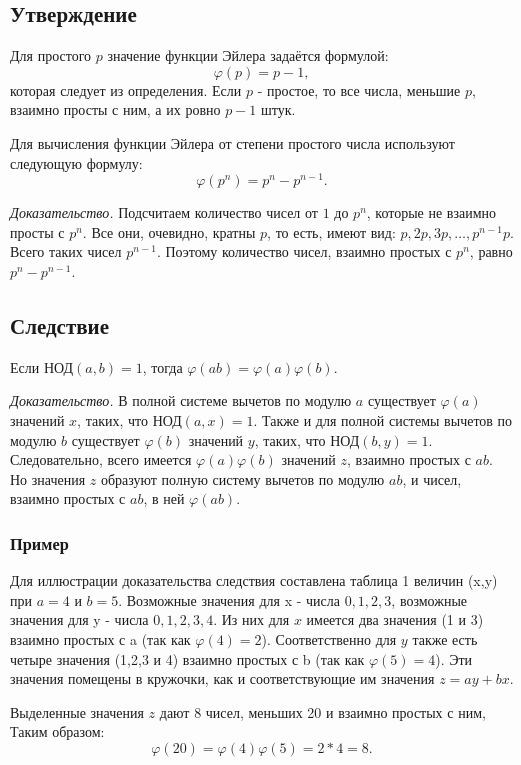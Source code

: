 \documentclass[12pt]{article}
\begin{document}
    \subsection{Утверждение} Для простого $p$ значение функции Эйлера задаётся формулой: \[\varphi(p)=p-1,\] которая следует из определения. Если $p$ - простое, то все числа, меньшие $p$, взаимно просты с ним, а их ровно $p-1$ штук.
    \par Для вычисления функции Эйлера от степени простого числа используют следующую формулу: \[\varphi(p^{n})=p^{n}-p^{n-1}.\]
    \par \textit{Доказательство.} Подсчитаем количество чисел от $1$ до $p^{n}$, которые не взаимно просты с $p^{n}$. Все они, очевидно, кратны $p$, то есть, имеют вид: $p,2p,3p,\dots,p^{n-1}p$. Всего таких чисел $p^{n-1}$. Поэтому количество чисел, взаимно простых с $p^{n}$, равно $p^{n}-p^{n-1}$.

    \subsection{Следствие} Если НОД$(a,b)=1$, тогда $\varphi(ab)=\varphi(a)\varphi(b)$.
    \par \textit{Доказательство.} В полной системе вычетов по модулю $a$ существует $\varphi(a)$ значений $x$, таких, что НОД$(a,x)=1$. Также и для полной системы вычетов по модулю $b$ существует $\varphi(b)$ значений $y$, таких, что НОД$(b,y)=1$. Следовательно, всего имеется $\varphi(a)\varphi(b)$ значений $z$, взаимно простых с $ab$. Но значения $z$ образуют полную систему вычетов по модулю $ab$, и чисел, взаимно простых с $ab$, в ней $\varphi(ab)$.

    \subsubsection{Пример} Для иллюстрации доказательства следствия составлена таблица 1 величин (x,y) при $a=4$ и $b=5$. Возможные значения для x - числа $0,1,2,3$, возможные значения для y - числа $0,1,2,3,4$. Из них для $x$ имеется два значения (1 и 3) взаимно простых с a (так как $\varphi(4)=2$). Соответственно для $y$ также есть четыре значения (1,2,3 и 4) взаимно простых с b (так как $\varphi(5)=4$). Эти значения помещены в кружочки, как и соответствующие им значения $z=ay+bx$.
    \par Выделенные значения $z$ дают 8 чисел, меньших 20 и взаимно простых с ним, Таким образом: \[\varphi(20)=\varphi(4)\varphi(5)=2*4=8.\]
\end{document}
